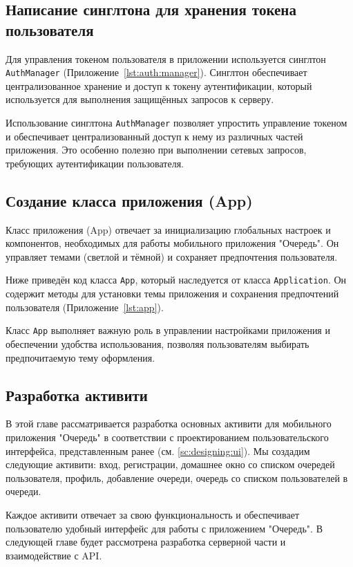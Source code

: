 \subsection{Написание синглтона для хранения токена пользователя}

Для управления токеном пользователя
в приложении используется синглтон \texttt{AuthManager}
(Приложение~\ref{lst:auth:manager}).
Синглтон обеспечивает централизованное хранение
и доступ к токену аутентификации,
который используется для выполнения защищённых запросов к серверу.\par
Использование синглтона \texttt{AuthManager}
позволяет упростить управление токеном
и обеспечивает централизованный доступ к нему из различных частей приложения.
Это особенно полезно при выполнении сетевых запросов,
требующих аутентификации пользователя.

\subsection{Создание класса приложения (App)}

Класс приложения (App) отвечает за инициализацию глобальных настроек
и компонентов, необходимых для работы мобильного приложения "Очередь".
Он управляет темами (светлой и тёмной)
и сохраняет предпочтения пользователя.\par
Ниже приведён код класса \texttt{App},
который наследуется от класса \texttt{Application}.
Он содержит методы для установки темы приложения
и сохранения предпочтений пользователя (Приложение~\ref{lst:app}).\par
Класс \texttt{App} выполняет важную роль в управлении настройками приложения
и обеспечении удобства использования,
позволяя пользователям выбирать предпочитаемую тему оформления.

\subsection{Разработка активити}

В этой главе рассматривается разработка основных активити
для мобильного приложения "Очередь"
в соответствии с проектированием пользовательского интерфейса,
представленным ранее (см. \ref{sc:designing:ui}).
Мы создадим следующие активити:
вход, регистрации, домашнее окно со списком очередей пользователя,
профиль, добавление очереди, очередь со списком пользователей в очереди.\par
Каждое активити отвечает за свою функциональность
и обеспечивает пользователю удобный интерфейс для работы
с приложением "Очередь". В следующей главе будет рассмотрена разработка
серверной части и взаимодействие с API.

